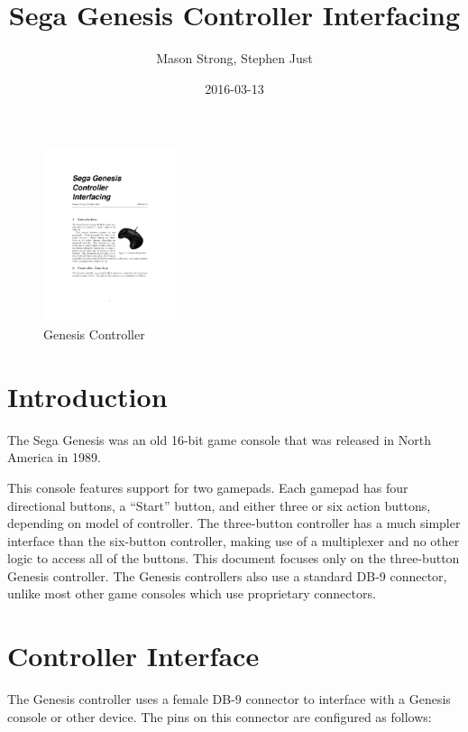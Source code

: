 \documentclass{capstonedoc}
\title{Sega Genesis Controller Interfacing}
\date{2016-03-13}
\author{Mason Strong, Stephen Just}
\begin{document}
\maketitle


\begin{figure}
  \includegraphics[width=0.35\textwidth]{genesis_controller}
  \caption{Genesis Controller}
  \label{fig:controller_photo}
\end{figure}

\section{Introduction}
The Sega Genesis was an old 16-bit game console that was released in North
America in 1989. \cite{SGHistory}

This console features support for two gamepads. Each gamepad has four
directional buttons, a ``Start'' button, and either three or six action
buttons, depending on model of controller. The three-button controller has a
much simpler interface than the six-button controller, making use of a
multiplexer and no other logic to access all of the buttons. This document
focuses only on the three-button Genesis controller. The Genesis controllers
also use a standard DB-9 connector, unlike most other game consoles which
use proprietary connectors.\cite{SGCHwInfo}

\section{Controller Interface}
The Genesis controller uses a female DB-9 connector to interface with a Genesis
console or other device. The pins on this connector are configured as follows:
\end{document}
